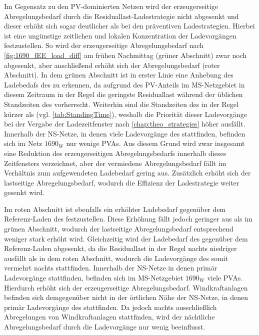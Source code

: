 Im Gegensatz zu den \gls{PV}-dominierten Netzen wird der erzeugerseitige Abregelungsbedarf durch die Residuallast-Ladestrategie nicht abgesenkt und dieser erhöht sich sogar deutlicher als bei den präventiven Ladestrategien.
Hierbei ist eine ungünstige zeitlichen und lokalen Konzentration der Ladevorgängen festzustellen.
So wird der erzeugerseitige Abregelungsbedarf nach \autoref{fig:1690_fEE_load_diff} am frühen Nachmittag (grüner Abschnitt) zwar noch abgesenkt, aber anschließend erhöht sich der Abregelungsbedarf (roter Abschnitt).
In dem grünen Abschnitt ist in erster Linie eine Anhebung des Ladebedafs des \UC \Firmeparkplatz zu erkennen, da aufgrund des \gls{PV}-Anteils im \gls{MS}-Netzgebiet in diesem Zeitraum in der Regel die geringste Residuallast während der üblichen Standzeiten des \UC \Firmeparkplatz vorherrscht.
Weiterhin sind die Standzeiten des \UC \Firmeparkplatz in der Regel kürzer als \zH (vgl. \autoref{tab:StandingTime}), weshalb die Priorität dieser Ladevorgänge bei der Vergabe der Ladezeitfenster nach \autoref{chap:theo_strategies} höher ausfällt.
Innerhalb der \gls{NS}-Netze, in denen viele Ladevorgänge des \UC \Firmeparkplatz stattfinden, befinden sich im Netz \(1690_{\text{W}}\) nur wenige \glspl{PVA}.
Aus diesem Grund wird zwar insgesamt eine Reduktion des erzeugerseitigen Abregelungsbedarfs innerhalb dieses Zeitfensters verzeichnet, aber der vermiedene Abregelungsbedarf fällt im Verhältnis zum aufgewendeten Ladebedarf gering aus.
Zusätzlich erhöht sich der lastseitige Abregelungsbedarf, wodurch die Effizienz der Ladestrategie weiter gesenkt wird.



Im roten Abschnitt ist ebenfalls ein erhöhter Ladebedarf gegenüber dem Referenz-Laden des \UC \Firmeparkplatz festzustellen.
Diese Erhöhung fällt jedoch geringer aus als im grünen Abschnitt, wodurch der lastseitige Abregelungsbedarf entsprechend weniger stark erhöht wird.
Gleichzeitig wird der Ladebedarf des \UC \zH gegenüber dem Referenz-Laden abgesenkt, da die Residuallast in der Regel nachts niedriger ausfällt als in dem roten Abschnitt, wodurch die Ladevorgänge des \UC \zH somit vermehrt nachts stattfinden.
Innerhalb der \gls{NS}-Netze in denen primär Ladevorgänge \zH stattfinden, befinden sich im \gls{MS}-Netzgebiet \(1690_{\text{W}}\) viele \glspl{PVA}.
Hierdurch erhöht sich der erzeugerseitige Abregelungsbedarf.
Windkraftanlagen befinden sich demgegenüber nicht in der örtlichen Nähe der \gls{NS}-Netze, in denen primär Ladevorgänge des \UC \zH stattfinden.
Da jedoch nachts ausschließlich Abregelungen von Windkraftanlagen stattfinden, wird der nächtliche Abregelungsbedarf durch die Ladevorgänge nur wenig beeinflusst.


